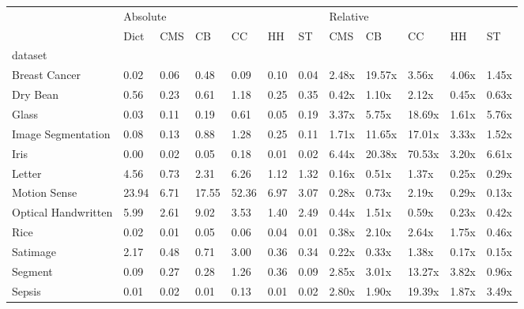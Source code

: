 \begin{tabular}{llllllllllll}
\toprule
{} & \multicolumn{6}{l}{Absolute} & \multicolumn{5}{l}{Relative} \\
{} &     Dict &   CMS &     CB &     CC &    HH &    ST &      CMS &      CB &      CC &     HH &     ST \\
dataset             &          &       &        &        &       &       &          &         &         &        &        \\
\midrule
Breast Cancer       &     0.02 &  0.06 &   0.48 &   0.09 &  0.10 &  0.04 &    2.48x &  19.57x &   3.56x &  4.06x &  1.45x \\
Dry Bean            &     0.56 &  0.23 &   0.61 &   1.18 &  0.25 &  0.35 &    0.42x &   1.10x &   2.12x &  0.45x &  0.63x \\
Glass               &     0.03 &  0.11 &   0.19 &   0.61 &  0.05 &  0.19 &    3.37x &   5.75x &  18.69x &  1.61x &  5.76x \\
Image Segmentation  &     0.08 &  0.13 &   0.88 &   1.28 &  0.25 &  0.11 &    1.71x &  11.65x &  17.01x &  3.33x &  1.52x \\
Iris                &     0.00 &  0.02 &   0.05 &   0.18 &  0.01 &  0.02 &    6.44x &  20.38x &  70.53x &  3.20x &  6.61x \\
Letter              &     4.56 &  0.73 &   2.31 &   6.26 &  1.12 &  1.32 &    0.16x &   0.51x &   1.37x &  0.25x &  0.29x \\
Motion Sense        &    23.94 &  6.71 &  17.55 &  52.36 &  6.97 &  3.07 &    0.28x &   0.73x &   2.19x &  0.29x &  0.13x \\
Optical Handwritten &     5.99 &  2.61 &   9.02 &   3.53 &  1.40 &  2.49 &    0.44x &   1.51x &   0.59x &  0.23x &  0.42x \\
Rice                &     0.02 &  0.01 &   0.05 &   0.06 &  0.04 &  0.01 &    0.38x &   2.10x &   2.64x &  1.75x &  0.46x \\
Satimage            &     2.17 &  0.48 &   0.71 &   3.00 &  0.36 &  0.34 &    0.22x &   0.33x &   1.38x &  0.17x &  0.15x \\
Segment             &     0.09 &  0.27 &   0.28 &   1.26 &  0.36 &  0.09 &    2.85x &   3.01x &  13.27x &  3.82x &  0.96x \\
Sepsis              &     0.01 &  0.02 &   0.01 &   0.13 &  0.01 &  0.02 &    2.80x &   1.90x &  19.39x &  1.87x &  3.49x \\

\end{tabular}
